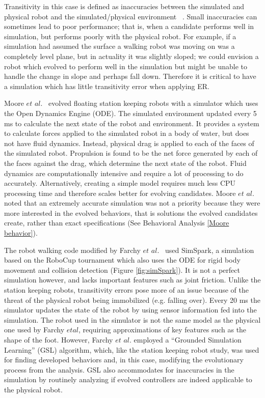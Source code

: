 \documentclass{sig-alternate}
\begin{document}
Transitivity in this case is defined as inaccuracies between the simulated and physical robot and the simulated/physical environment ~\cite{Farchy:2013:HRL:2484920.2484930}. Small inaccuracies can sometimes lead to poor performance; that is, when a candidate performs well in simulation, but performs poorly with the physical robot. For example, if a simulation had assumed the surface a walking robot was moving on was a completely level plane, but in actuality it was slightly sloped; we could envision a robot which evolved to perform well in the simulation but might be unable to handle the change in slope and perhaps fall down. Therefore it is critical to have a simulation which has little transitivity error when applying ER.

 Moore $et$ $al.$  ~\cite{Moore:2013:ESK:2463372.2463402}evolved floating station keeping robots with a simulator which uses the Open Dynamics Engine (ODE). The simulated environment updated every 5 ms to calculate the next state of the robot and environment. It provides a system to calculate forces applied to the simulated robot in a body of water, but does not have fluid dynamics. Instead, physical drag is applied to each of the faces of the simulated robot. Propulsion is found to be the net force generated by each of the faces against the drag, which determine the next state of the robot. Fluid dynamics are computationally intensive and require a lot of processing to do accurately. Alternatively, creating a simple model requires much less CPU processing time and therefore scales better for evolving candidates. Moore $et$ $al.$ noted that an extremely accurate simulation was not a priority because they were more interested in the evolved behaviors, that is solutions the evolved candidates create, rather than exact specifications (See Behavioral Analysis \ref{Moore behavior}).
 
 The robot walking code modified by Farchy $et$ $al.$~\cite{Farchy:2013:HRL:2484920.2484930} used SimSpark, a simulation based on the RoboCup tournament which also uses the ODE for rigid body movement and collision detection (Figure \ref{fig:simSpark}). It is not a perfect simulation however, and lacks important features such as joint friction. Unlike the station keeping robots, transitivity errors pose more of an issue because of the threat of the physical robot being immobilized (e.g. falling over). Every 20 ms the simulator updates the state of the robot by using sensor information  fed into the simulation. The robot used in the simulator is not the same model as the physical one used by Farchy $et al$, requiring approximations of key features such as the shape of the foot. However, Farchy $et$ $al.$ employed a ``Grounded Simulation Learning'' (GSL) algorithm, which, like the station keeping robot study, was used for finding developed behaviors and, in this case, modifying the evolutionary process from the analysis. GSL also accommodates for inaccuracies in the simulation by routinely analyzing if evolved controllers are indeed applicable to the physical robot.
 
\end{document}
